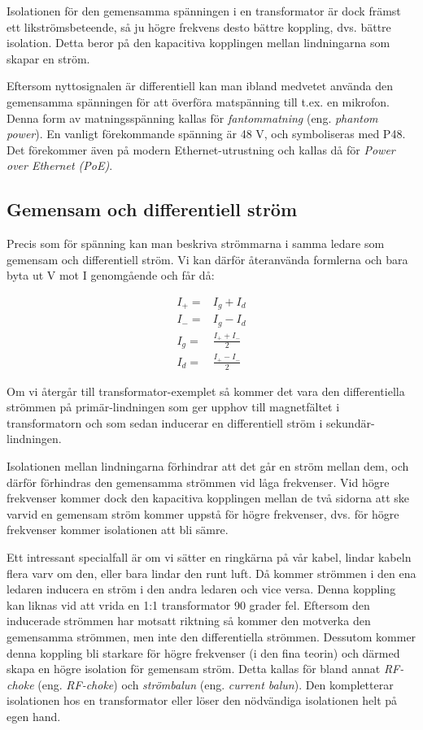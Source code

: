 Isolationen för den gemensamma spänningen i en transformator är dock främst ett
likströmsbeteende, så ju högre frekvens desto bättre koppling, dvs. bättre
isolation. Detta beror på den kapacitiva kopplingen mellan lindningarna som
skapar en ström.

Eftersom nyttosignalen är differentiell kan man ibland medvetet använda den
gemensamma spänningen för att överföra matspänning till t.ex. en mikrofon.
Denna form av matningsspänning kallas för \emph{fantommatning} (eng. \emph{phantom
power}). En vanligt förekommande spänning är 48 V, och symboliseras med P48.
Det förekommer även på modern Ethernet-utrustning och kallas då för
\emph{Power over Ethernet (PoE)}.

\subsection{Gemensam och differentiell ström}
\label{comdiffi}

Precis som för spänning kan man beskriva strömmarna i samma ledare som
gemensam och differentiell ström. Vi kan därför återanvända formlerna och bara
byta ut V mot I genomgående och får då:

\begin{eqnarray}
I_+ = & I_g + I_d\\
I_- = & I_g - I_d\\
I_g = & \frac{I_+ + I_-}{2}\\
I_d = & \frac{I_+ - I_-}{2}
\end{eqnarray}

Om vi återgår till transformator-exemplet så kommer det vara den differentiella
strömmen på primär-lindningen som ger upphov till magnetfältet i transformatorn
och som sedan inducerar en differentiell ström i sekundär-lindningen.

Isolationen mellan lindningarna förhindrar att det går en ström mellan dem,
och därför förhindras den gemensamma strömmen vid låga frekvenser. Vid högre
frekvenser kommer dock den kapacitiva kopplingen mellan de två sidorna att
ske varvid en gemensam ström kommer uppstå för högre frekvenser, dvs. för
högre frekvenser kommer isolationen att bli sämre.

Ett intressant specialfall är om vi sätter en ringkärna på vår kabel, lindar
kabeln flera varv om den, eller bara lindar den runt luft. Då kommer strömmen
i den ena ledaren inducera en ström i den andra ledaren och vice versa.
Denna koppling kan liknas vid att vrida en 1:1 transformator 90 grader fel.
Eftersom den inducerade strömmen har motsatt riktning så kommer den motverka
den gemensamma strömmen, men inte den differentiella strömmen. Dessutom kommer
denna koppling bli starkare för högre frekvenser (i den fina teorin) och
därmed skapa en högre isolation för gemensam ström. Detta kallas för
bland annat \emph{RF-choke} (eng. \emph{RF-choke}) och \emph{strömbalun} (eng.
\emph{current balun}). Den kompletterar isolationen hos en transformator
eller löser den nödvändiga isolationen helt på egen hand.


